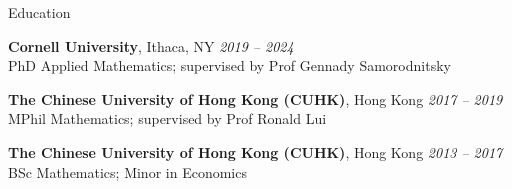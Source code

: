\documentclass{resume} %
\begin{document}

\begin{rSection}{Education}

{\bf Cornell University}, Ithaca, NY \hfill
{\em 2019 -- 2024} \\
PhD Applied Mathematics; supervised by Prof Gennady Samorodnitsky

{\bf The Chinese University of Hong Kong (CUHK)}, Hong Kong \hfill
{\em 2017 -- 2019} \\
MPhil Mathematics; supervised by Prof Ronald Lui %

{\bf The Chinese University of Hong Kong (CUHK)}, Hong Kong \hfill
{\em 2013 -- 2017} \\
BSc Mathematics; Minor in Economics %




\end{rSection}

\iffalse
\begin{rSection}{Research Interests}
 Topological Data Analysis, Stochastic Topology, Network Analysis, Computational Geometry
\end{rSection}
\fi
\end{document}
